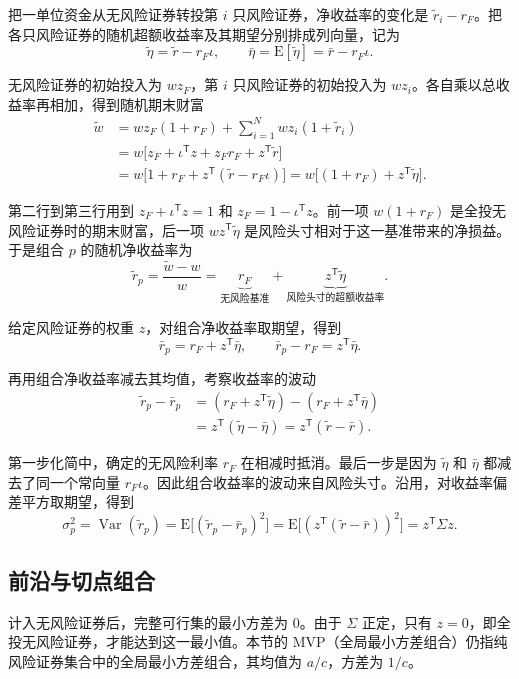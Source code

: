 把一单位资金从无风险证券转投第 $i$ 只风险证券，净收益率的变化是 $\widetilde r_i-r_F$。把各只风险证券的随机超额收益率及其期望分别排成列向量，记为
\[
 \widetilde\eta=\widetilde r-r_F\iota,
 \qquad \bar\eta=\mathrm E[\widetilde\eta]=\bar r-r_F\iota.
\]

无风险证券的初始投入为 $wz_F$，第 $i$ 只风险证券的初始投入为 $wz_i$。各自乘以总收益率再相加，得到随机期末财富
\[
 \begin{aligned}
 \widetilde w
 &=wz_F(1+r_F)+\sum_{i=1}^N wz_i(1+\widetilde r_i)\\
 &=w\bigl[z_F+\iota^{\mathsf T}z+z_F r_F+z^{\mathsf T}\widetilde r\bigr]\\
 &=w\bigl[1+r_F+z^{\mathsf T}(\widetilde r-r_F\iota)\bigr]
 =w\bigl[(1+r_F)+z^{\mathsf T}\widetilde\eta\bigr].
 \end{aligned}
\]

第二行到第三行用到 $z_F+\iota^{\mathsf T}z=1$ 和 $z_F=1-\iota^{\mathsf T}z$。前一项 $w(1+r_F)$ 是全投无风险证券时的期末财富，后一项 $wz^{\mathsf T}\widetilde\eta$ 是风险头寸相对于这一基准带来的净损益。于是组合 $p$ 的随机净收益率为
\[
 \widetilde r_p=\frac{\widetilde w-w}{w}
 =\underbrace{r_F}_{\text{无风险基准}}
   +\underbrace{z^{\mathsf T}\widetilde\eta}_{\text{风险头寸的超额收益率}}.
\]

给定风险证券的权重 $z$，对组合净收益率取期望，得到
\[
 \bar r_p=r_F+z^{\mathsf T}\bar\eta,
 \qquad \bar r_p-r_F=z^{\mathsf T}\bar\eta.
\]

再用组合净收益率减去其均值，考察收益率的波动
\[
 \begin{aligned}
 \widetilde r_p-\bar r_p
 &=(r_F+z^{\mathsf T}\widetilde\eta)-(r_F+z^{\mathsf T}\bar\eta)\\
 &=z^{\mathsf T}(\widetilde\eta-\bar\eta)
 =z^{\mathsf T}(\widetilde r-\bar r).
 \end{aligned}
\]

第一步化简中，确定的无风险利率 $r_F$ 在相减时抵消。最后一步是因为 $\widetilde\eta$ 和 $\bar\eta$ 都减去了同一个常向量 $r_F\iota$。因此组合收益率的波动来自风险头寸。沿用，对收益率偏差平方取期望，得到
\[
 \sigma_p^2=\operatorname{Var}(\widetilde r_p)
 =\mathrm E\bigl[(\widetilde r_p-\bar r_p)^2\bigr]
 =\mathrm E\bigl[(z^{\mathsf T}(\widetilde r-\bar r))^2\bigr]
 =z^{\mathsf T}\Sigma z.
\]

\subsection{前沿与切点组合}
计入无风险证券后，完整可行集的最小方差为 $0$。由于 $\Sigma$ 正定，只有 $z=0$，即全投无风险证券，才能达到这一最小值。本节的 MVP（全局最小方差组合）仍指纯风险证券集合中的全局最小方差组合，其均值为 $a/c$，方差为 $1/c$。


